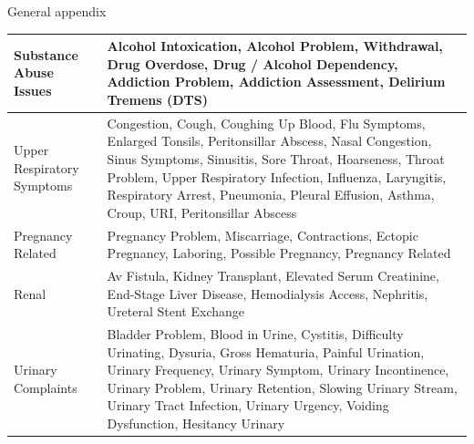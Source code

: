 \documentclass[,,nonblindrev]{informs}
\begin{document}
\begin{APPENDIX}{General appendix}
\begin{longtable}{|p{5cm}|p{12cm}|}
\hline
Substance Abuse Issues & Alcohol Intoxication, Alcohol Problem, Withdrawal, Drug Overdose, Drug / Alcohol Dependency, Addiction Problem, Addiction Assessment, Delirium Tremens (DTS) \\
\hline
Upper Respiratory Symptoms & Congestion, Cough, Coughing Up Blood, Flu Symptoms, Enlarged Tonsils, Peritonsillar Abscess, Nasal Congestion, Sinus Symptoms, Sinusitis, Sore Throat, Hoarseness, Throat Problem, Upper Respiratory Infection, Influenza, Laryngitis, Respiratory Arrest, Pneumonia, Pleural Effusion, Asthma, Croup, URI, Peritonsillar Abscess \\
\hline
Pregnancy Related & Pregnancy Problem, Miscarriage, Contractions, Ectopic Pregnancy, Laboring, Possible Pregnancy, Pregnancy Related \\
\hline
Renal & Av Fistula, Kidney Transplant, Elevated Serum Creatinine, End-Stage Liver Disease, Hemodialysis Access, Nephritis, Ureteral Stent Exchange \\
\hline
Urinary Complaints & Bladder Problem, Blood in Urine, Cystitis, Difficulty Urinating, Dysuria, Gross Hematuria, Painful Urination, Urinary Frequency, Urinary Symptom, Urinary Incontinence, Urinary Problem, Urinary Retention, Slowing Urinary Stream, Urinary Tract Infection, Urinary Urgency, Voiding Dysfunction, Hesitancy Urinary \\
\hline
\end{longtable}

\newpage


\end{APPENDIX}
\end{document}
